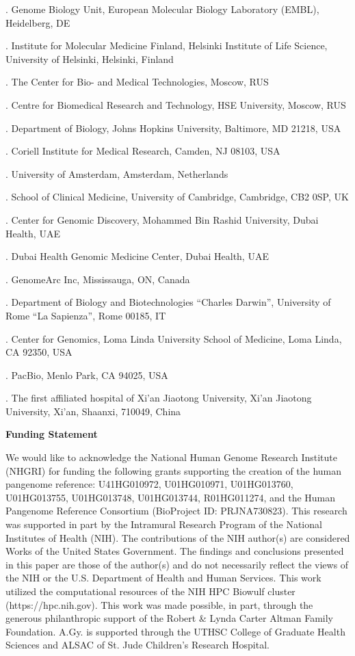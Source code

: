 \documentclass[pdflatex,mathphys]{jnl}
\begin{document}
{. Genome Biology Unit, European Molecular Biology Laboratory (EMBL), Heidelberg, DE\par
{}. Institute for Molecular Medicine Finland, Helsinki Institute of Life Science, University of Helsinki, Helsinki, Finland\par
{}. The Center for Bio- and Medical Technologies, Moscow, RUS\par
{}. Centre for Biomedical Research and Technology, HSE University, Moscow, RUS\par
{}. Department of Biology, Johns Hopkins University, Baltimore, MD 21218, USA\par
{}. Coriell Institute for Medical Research, Camden, NJ 08103, USA\par
{}. University of Amsterdam, Amsterdam, Netherlands\par
{}. School of Clinical Medicine, University of Cambridge, Cambridge, CB2 0SP, UK\par
{}. Center for Genomic Discovery, Mohammed Bin Rashid University, Dubai Health, UAE\par
{}. Dubai Health Genomic Medicine Center, Dubai Health, UAE\par
{}. GenomeArc Inc, Mississauga, ON, Canada\par
{}. Department of Biology and Biotechnologies ``Charles Darwin'', University of Rome ``La Sapienza'', Rome 00185, IT\par
{}. Center for Genomics, Loma Linda University School of Medicine, Loma Linda, CA 92350, USA\par
{}. PacBio, Menlo Park, CA 94025, USA\par
{}. The first affiliated hospital of Xi'an Jiaotong University, Xi'an Jiaotong University, Xi'an, Shaanxi, 710049, China\par
}
\bigskip
\noindent\textbf{Funding Statement}\par
\noindent We would like to acknowledge the National Human Genome Research Institute (NHGRI) for funding the following grants supporting the creation of the human pangenome reference: U41HG010972, U01HG010971, U01HG013760, U01HG013755, U01HG013748, U01HG013744, R01HG011274, and the Human Pangenome Reference Consortium (BioProject ID: PRJNA730823). This research was supported in part by the Intramural Research Program of the National Institutes of Health (NIH). The contributions of the NIH author(s) are considered Works of the United States Government. The findings and conclusions presented in this paper are those of the author(s) and do not necessarily reflect the views of the NIH or the U.S. Department of Health and Human Services. This work utilized the computational resources of the NIH HPC Biowulf cluster (https://hpc.nih.gov). This work was made possible, in part, through the generous philanthropic support of the Robert \& Lynda Carter Altman Family Foundation. A.Gy. is supported through the UTHSC College of Graduate Health Sciences and ALSAC of St. Jude Children's Research Hospital.\par
\end{document}

